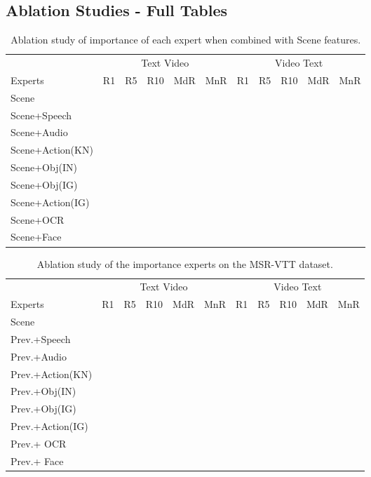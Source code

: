 \documentclass{bmvc2k}
\begin{document}
\subsection{Ablation Studies - Full Tables}
\begin{table}[h!]
\centering 
\footnotesize 
\setlength{\tabcolsep}{2pt}
\begin{tabular}{l c c c c c| c c c c c}
\hline \hline
\multicolumn{1}{c}{} & 
\multicolumn{5}{c}{Text  Video} & \multicolumn{5}{c}{Video  Text} \\
Experts & R1 & R5 & R10 & MdR & MnR & R1 & R5 & R10 & MdR & MnR \\ 
\hline 
Scene &	&	&	&	& &	&	&	&	& \\
Scene+Speech &	&	&	&	& &	&	&	&	& \\
Scene+Audio &	&	&	&	& &	&	&	&	& \\
Scene+Action(KN) &	&	&	&	& &	&	&	&	& \\
Scene+Obj(IN) &	&	&	&	& &	&	&	&	& \\
Scene+Obj(IG) &	&	&	&	& &	&	&	&	& \\
Scene+Action(IG) &	&	&	&	& &	&	&	&	& \\
Scene+OCR	&	&	&	&	& &	&	&	&	& \\
Scene+Face &	&	&	&	& &	&	&	&	& \\

\hline \hline

\end{tabular}
\caption{Ablation study of importance of each expert when combined with Scene features.}
\label{table:Ablation_single_extended} 
\end{table}




\begin{table}[h!]
\centering 
\footnotesize 
\setlength{\tabcolsep}{2pt}
\begin{tabular}{l c c c c c| c c c c c}
\hline \hline
\multicolumn{1}{c}{} & 
\multicolumn{5}{c}{Text  Video} & \multicolumn{5}{c}{Video  Text} \\
Experts & R1 & R5 & R10 & MdR & MnR & R1 & R5 & R10 & MdR & MnR \\ 
\hline 
Scene &	&	&	&	& &	&	&	&	& \\
Prev.+Speech &	&	&	&	& &	&	&	&	& \\
Prev.+Audio &	&	&	&	& &	&	&	&	& \\
Prev.+Action(KN) &	&	&	&	& &	&	&	&	& \\
Prev.+Obj(IN) &	&	&	&	& &	&	&	&	& \\
Prev.+Obj(IG) &	&	&	&	& &	&	&	&	& \\
Prev.+Action(IG) &	&	&	&	& &	&	&	&	&	\\
Prev.+ OCR &	&	&	&	& &	&	&	&	& \\
Prev.+ Face &	&	&	&	& &	&	&	&	& \\

\hline \hline

\end{tabular}
\caption{Ablation study of the importance experts on the MSR-VTT dataset.}
\end{table}
\end{document}
